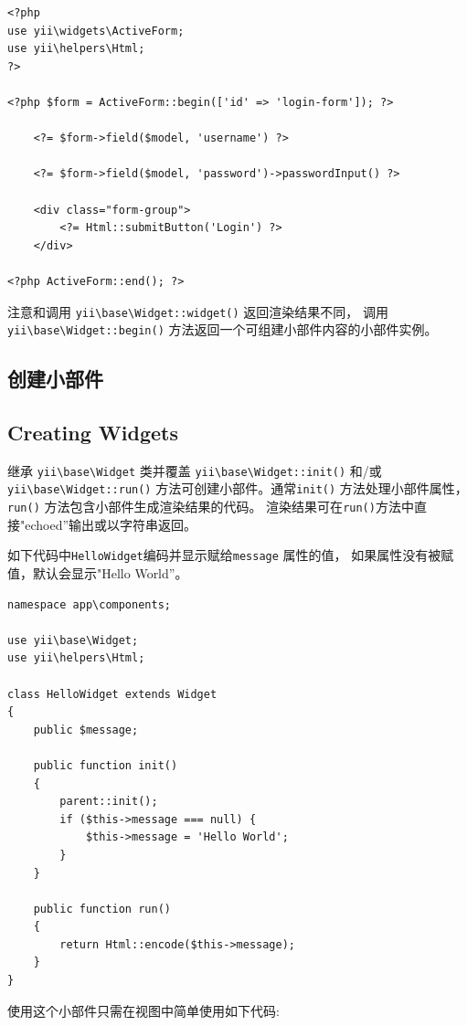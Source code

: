 \lstset{language=php}\begin{lstlisting}
<?php
use yii\widgets\ActiveForm;
use yii\helpers\Html;
?>

<?php $form = ActiveForm::begin(['id' => 'login-form']); ?>

    <?= $form->field($model, 'username') ?>

    <?= $form->field($model, 'password')->passwordInput() ?>

    <div class="form-group">
        <?= Html::submitButton('Login') ?>
    </div>

<?php ActiveForm::end(); ?>
\end{lstlisting}
注意和调用 \texttt{yii{\allowbreak{}\textbackslash}base{\allowbreak{}\textbackslash}Widget\allowbreak{}::\allowbreak{}widget()} 返回渲染结果不同，
调用 \texttt{yii{\allowbreak{}\textbackslash}base{\allowbreak{}\textbackslash}Widget\allowbreak{}::\allowbreak{}begin()} 方法返回一个可组建小部件内容的小部件实例。

\subsection{创建小部件 \label{structure-widgets.md::creating-widgets}}
\subsection{Creating Widgets \label{structure-widgets.md::creating-widgets}}
继承 \texttt{yii{\allowbreak{}\textbackslash}base{\allowbreak{}\textbackslash}Widget} 类并覆盖 \texttt{yii{\allowbreak{}\textbackslash}base{\allowbreak{}\textbackslash}Widget\allowbreak{}::\allowbreak{}init()} 和/或
\texttt{yii{\allowbreak{}\textbackslash}base{\allowbreak{}\textbackslash}Widget\allowbreak{}::\allowbreak{}run()} 方法可创建小部件。通常\lstinline|init()| 方法处理小部件属性，
\lstinline|run()| 方法包含小部件生成渲染结果的代码。
渲染结果可在\lstinline|run()|方法中直接"echoed''输出或以字符串返回。

如下代码中\lstinline|HelloWidget|编码并显示赋给\lstinline|message| 属性的值，
如果属性没有被赋值，默认会显示"Hello World''。

\lstset{language=php}\begin{lstlisting}
namespace app\components;

use yii\base\Widget;
use yii\helpers\Html;

class HelloWidget extends Widget
{
    public $message;

    public function init()
    {
        parent::init();
        if ($this->message === null) {
            $this->message = 'Hello World';
        }
    }

    public function run()
    {
        return Html::encode($this->message);
    }
}
\end{lstlisting}
使用这个小部件只需在视图中简单使用如下代码:

